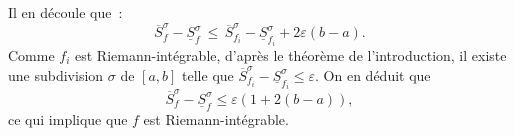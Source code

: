 {\begin{enumerate}
{Il en d\'ecoule que~:
\begin{equation*}
\overline{S}_{f}^{\sigma} - \underline{S}_{f}^{\sigma}\, \leq\,
\overline{S}_{f_{i}}^{\sigma} - \underline{S}_{f_{i}}^{\sigma} +
2\varepsilon (b- a).
\end{equation*}
Comme $f_{i}$ est Riemann-int\'egrable, d'apr\`es le th\'eor\`eme
de l'introduction, il existe une subdivision $\sigma$ de $[a, b]$ telle que
$\overline{S}_{f_{i}}^{\sigma} - \underline{S}_{f_{i}}^{\sigma}
\leq \varepsilon$. On en d\'eduit que
\begin{equation*}
\overline{S}_{f}^{\sigma} - \underline{S}_{f}^{\sigma} \leq
\varepsilon \left(1 + 2(b-a)\right),
\end{equation*}
ce qui implique que $f$ est Riemann-int\'egrable.}
\end{enumerate}
}
